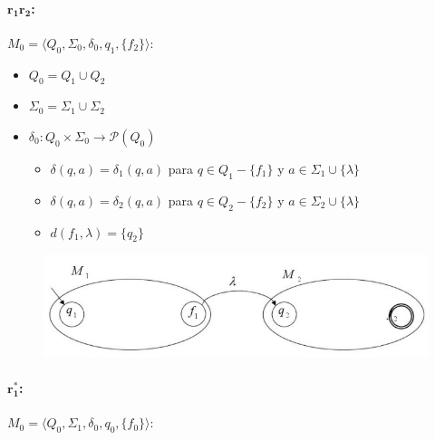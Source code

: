 \paragraph{\(\bm{r_1r_2}\):} \(M_0=\langle Q_0, \Sigma_0, \delta_0, q_1, \{f_2\}\rangle\):
\begin{itemize}
  \item \(Q_0 = Q_1 \cup Q_2\)
  \item \(\Sigma_0 = \Sigma_1 \cup \Sigma_2\)
  \item \(\delta_0: Q_0 \times \Sigma_0 \rightarrow \mathcal{P}(Q_0)\)
        \begin{itemize}
          \item[] \(\delta(q, a) = \delta_1(q, a)\) para \(q\in Q_1-\{f_1\}\) y \(a\in \Sigma_1\cup\{\lambda\}\)
          \item[] \(\delta(q, a) = \delta_2(q, a)\) para \(q\in Q_2-\{f_2\}\) y \(a\in \Sigma_2\cup\{\lambda\}\)
          \item[] \(d(f_1,\lambda) = \{q_2\}\)
        \end{itemize}
\end{itemize}
\begin{figure}[H]
  \begin{center}
    \includegraphics[scale=0.5]{imagenes/concat}
  \end{center}
\end{figure}

\paragraph{\(\bm{r_1^*}\):} \(M_0=\langle Q_0, \Sigma_1, \delta_0, q_0, \{f_0\}\rangle\):

